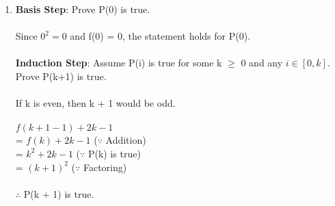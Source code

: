 \documentclass[12pt]{article}
\begin{document}
\begin{enumerate}[label = (\alph*)]
    \item 

        \textbf{Basis Step}: Prove P(0) is true.\\
        \\
        Since $0^2 = 0$ and f(0) = 0, the statement holds for P(0). \\
        \\
        \textbf{Induction Step}: Assume P(i) is true for some k $\geq$ 0 and any 
        $i \in [0, k]$. Prove P(k+1) is true. \\
        \\
        If k is even, then k + 1 would be odd. \\
        \\
        $f(k+1-1)+2k-1$ \\
        = $f(k)+2k-1$ \hspace{3em} ($\because$ Addition) \\
        = $k^2+2k-1$ \hspace{4em} ($\because$ P(k) is true) \\
        = $(k+1)^2$ \hspace{5em} ($\because$ Factoring) \\
        \\
        $\therefore$ P(k + 1) is true.
\end{enumerate}
\end{document}
